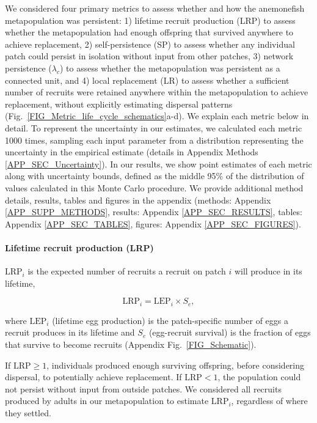 \documentclass[12pt, oneside]{article}   	%
\begin{document}
We considered four primary metrics to assess whether and how the anemonefish metapopulation was persistent: 1) lifetime recruit production (LRP) to assess whether the metapopulation had enough offspring that survived anywhere to achieve replacement, 2) self-persistence (SP) to assess whether any individual patch could persist in isolation without input from other patches, 3) network persistence ($\lambda_c$) to assess whether the metapopulation was persistent as a connected unit, and 4) local replacement (LR) to assess whether a sufficient number of recruits were retained anywhere within the metapopulation to achieve replacement, without explicitly estimating dispersal patterns (Fig.\ \ref{FIG_Metric_life_cycle_schematics}a-d). We explain each metric below in detail. To represent the uncertainty in our estimates, we calculated each metric 1000 times, sampling each input parameter from a distribution representing the uncertainty in the empirical estimate (details in Appendix Methods \ref{APP_SEC_Uncertainty}). In our results, we show point estimates of each metric along with uncertainty bounds, defined as the middle 95\% of the distribution of values calculated in this Monte Carlo procedure. We provide additional method details, results, tables and figures in the appendix (methods: Appendix \ref{APP_SUPP_METHODS}, results: Appendix \ref{APP_SEC_RESULTS}, tables: Appendix \ref{APP_SEC_TABLES}, figures: Appendix \ref{APP_SEC_FIGURES}).%

\paragraph*{Lifetime recruit production (LRP)}
$\text{LRP}_i$ is the expected number of recruits a recruit on patch $i$ will produce in its lifetime,

\begin{equation}
\text{LRP}_i = \text{LEP}_i \times S_e, \label{EQN_LRP}
\end{equation}

where $\text{LEP}_i$ (lifetime egg production) is the patch-specific number of eggs a recruit produces in its lifetime and $S_e$ (egg-recruit survival) is the fraction of eggs that survive to become recruits (Appendix Fig.\ \ref{FIG_Schematic}).

If $\text{LRP} \geq 1$, individuals produced enough surviving offspring, before considering dispersal, to potentially achieve replacement. If $\text{LRP} < 1$, the population could not persist without input from outside patches. We considered all recruits produced by adults in our metapopulation to estimate $\text{LRP}_i$, regardless of where they settled. %
\end{document}
